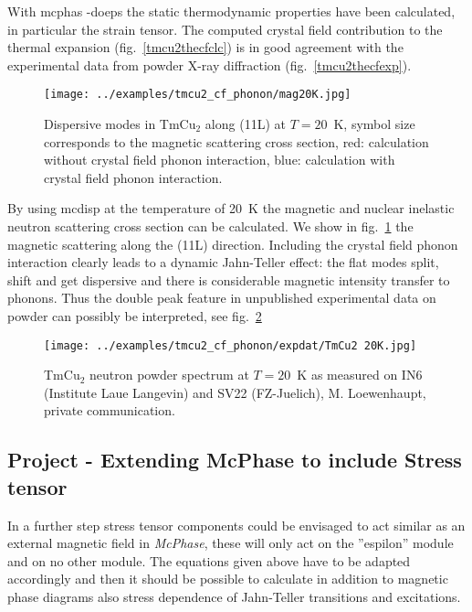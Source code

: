 With {\prg mcphas -doeps} the static thermodynamic properties have been calculated, in particular
the strain tensor. The computed crystal field contribution to the thermal expansion (fig.~\ref{tmcu2thecfclc}) is 
in good agreement with the experimental data from powder X-ray diffraction (fig.~\ref{tmcu2thecfexp}).


\begin{figure}[htb]%
\begin{center}\leavevmode
\texttt{[image: ../examples/tmcu2\_cf\_phonon/mag20K.jpg]}
\end{center}
\caption{Dispersive modes in TmCu$_2$ along (11L) at $T=20$~K, symbol size corresponds to the 
magnetic scattering cross section, red: calculation without crystal field phonon interaction, blue:
calculation with crystal field phonon interaction.}
\label{tmcu2mag20k}
\end{figure}

By using {\prg mcdisp} at the temperature of 20~K the magnetic and nuclear inelastic neutron
scattering cross section can be calculated. We show in fig.~\ref{tmcu2mag20k} the magnetic scattering along
the (11L) direction. Including the crystal field phonon interaction clearly leads to a dynamic
Jahn-Teller effect: the flat modes  split, shift and get
dispersive and there is considerable magnetic intensity transfer to phonons.
Thus the double peak feature in unpublished experimental data on powder can possibly
be interpreted, see fig.~\ref{tmcu2mag20kexp}

\begin{figure}[htb]%
\begin{center}\leavevmode
\texttt{[image: ../examples/tmcu2\_cf\_phonon/expdat/TmCu2 20K.jpg]}
\end{center}
\caption{TmCu$_2$ neutron powder spectrum at $T=20$~K as measured on IN6 (Institute Laue Langevin) and
SV22 (FZ-Juelich), M. Loewenhaupt, private communication.}
\label{tmcu2mag20kexp}
\end{figure}

\clearpage

\subsection{Project - Extending McPhase to include Stress tensor}

 In a further step stress tensor components could be envisaged 
to act similar as an external magnetic field in {\em McPhase}, these will only act on the
''espilon'' module and on no other module. The equations given above have to be adapted accordingly 
and then it should be possible to calculate in addition to magnetic phase diagrams also stress dependence
of Jahn-Teller transitions and excitations. 


